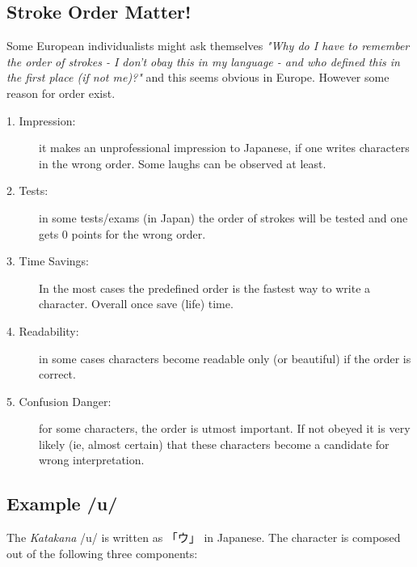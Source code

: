 \subsection{Stroke Order Matter!}
\label{sec:StrokeOrderMatter}

Some European individualists might ask themselves \textit{"Why do I have to
remember the order of strokes - I don't obay this in my language - and who
defined this in the first place (if not me)?"} and this seems obvious in
Europe. However some reason for order exist. 


\begin{description}

\item[1. Impression:] it makes an unprofessional impression to Japanese, if one
writes characters in the wrong order. Some laughs can be observed at least.

\item[2. Tests:]  in some tests/exams (in Japan) the order of strokes will be
tested and one gets 0 points for the wrong order. 

\item[3. Time Savings:] In the most cases the predefined order is the fastest
way to write a character. Overall once save (life) time.

\item[4. Readability:] in some cases characters become readable only (or
beautiful) if the order is correct.

\item[5. Confusion Danger:] for some characters, the order is utmost
important. If not obeyed it is very likely (ie, almost certain) that these
characters become a candidate for wrong interpretation. 

\end{description}
\normalsize

\newpage
\subsection{Example /u/ }
\label{subsec:ExampleU}

The \textit{Katakana} /u/ is written as {「ウ」} in Japanese. The character is
composed out of the following three components:

